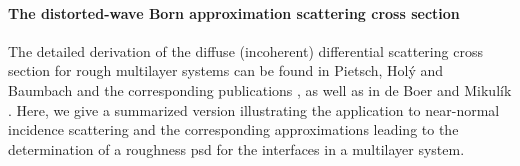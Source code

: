 \paragraph{The distorted-wave Born approximation scattering cross section}
The detailed derivation of the diffuse (incoherent) differential scattering cross section for rough multilayer systems can be found in Pietsch, Hol\'{y} and Baumbach \cite{pietsch_high-resolution_2004} and the corresponding publications \cite{sinha_x-ray_1988,holy_nonspecular_1994}, as well as in de Boer \cite{de_boer_x-ray_1996} and Mikul\'{i}k \cite{mikulik_x-ray_1997}. Here, we give a summarized version illustrating the application to near-normal incidence scattering and the corresponding approximations leading to the determination of a roughness \gls{psd} for the interfaces in a multilayer system.

